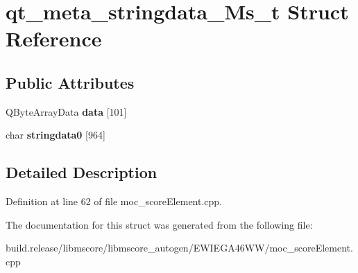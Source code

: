 \hypertarget{structqt__meta__stringdata___ms__t}{}\section{qt\+\_\+meta\+\_\+stringdata\+\_\+\+Ms\+\_\+t Struct Reference}
\label{structqt__meta__stringdata___ms__t}
\subsection*{Public Attributes}
\begin{DoxyCompactItemize}
\item 
\mbox{\label{structqt__meta__stringdata___ms__t_a1c9aef05f6b529d7361d3f2e614f52a2}} 
Q\+Byte\+Array\+Data {\bfseries data} \mbox{[}101\mbox{]}
\item 
\mbox{\label{structqt__meta__stringdata___ms__t_af4fe405c8fe530bdc868d07328e14908}} 
char {\bfseries stringdata0} \mbox{[}964\mbox{]}
\end{DoxyCompactItemize}


\subsection{Detailed Description}


Definition at line 62 of file moc\+\_\+score\+Element.\+cpp.



The documentation for this struct was generated from the following file\+:\begin{DoxyCompactItemize}
\item 
build.\+release/libmscore/libmscore\+\_\+autogen/\+E\+W\+I\+E\+G\+A46\+W\+W/moc\+\_\+score\+Element.\+cpp\end{DoxyCompactItemize}
